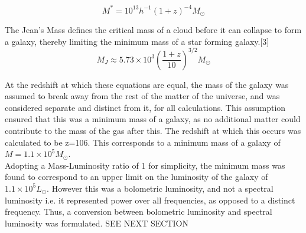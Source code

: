 \documentclass[pdf,color]{UoBnote}
\begin{document}
\begin{equation}
M^*=10^{13}h^{-1}(1+z)^{-4} M_\odot
\end{equation}

 The Jean's Mass defines the critical mass of a cloud before it can collapse to form a galaxy, thereby limiting the minimum mass of a star forming galaxy.[3]
\begin{equation}
M_J\approx 5.73\times10^3 \left (\frac{1+z}{10} \right )^{3/2} M_{\odot}
\end{equation}

At the redshift at which these equations are equal, the mass of the galaxy was assumed to break away from the rest of the matter of the universe, and was considered separate and distinct from it, for all calculations. This assumption ensured that this was a minimum mass of a galaxy, as no additional matter could contribute to the mass of the gas after this. The redshift at which this occurs was calculated to be z=106. This corresponds to a minimum mass of a galaxy of $M=1.1\times10^5M_\odot$.\\
\newline
Adopting a Mass-Luminosity ratio of 1 for simplicity, the minimum mass was found to correspond to an upper limit on the luminosity of the galaxy of $1.1\times 10^5 L_\odot$. However this was a bolometric luminosity, and not a spectral luminosity i.e. it represented power over all frequencies, as opposed to a distinct frequency. Thus, a conversion between bolometric luminosity and spectral luminosity was formulated. SEE NEXT SECTION
\end{document}
